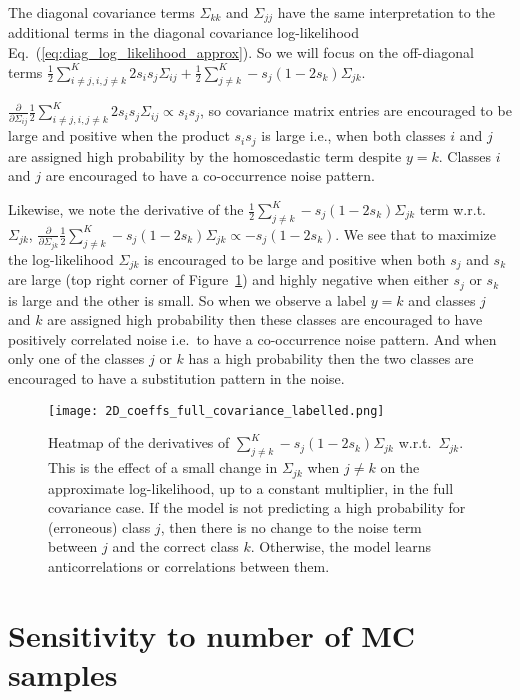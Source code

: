 \documentclass[final]{cvpr}
\begin{document}
The diagonal covariance terms $\Sigma_{kk}$ and $\Sigma_{jj}$ have the same interpretation to the additional terms in the diagonal covariance log-likelihood Eq.~(\ref{eq:diag_log_likelihood_approx}). So we will focus on the off-diagonal terms $\frac{1}{2} \sum_{i \neq j, i,j \neq k}^K 2 s_i s_j \Sigma_{ij} + \frac{1}{2} \sum_{j \neq k}^K - s_j (1 - 2 s_k) \Sigma_{jk}$.

$\frac{\partial}{\partial \Sigma_{ij}}\frac{1}{2} \sum_{i \neq j, i,j \neq k}^K 2 s_i s_j \Sigma_{ij} \propto s_i s_j$, so covariance matrix entries are encouraged to be large and positive when the product $s_i s_j$ is large i.e., when both classes $i$ and $j$ are assigned high probability by the homoscedastic term despite $y = k$. Classes $i$ and $j$ are encouraged to have a co-occurrence noise pattern.

Likewise, we note the derivative of the $\frac{1}{2} \sum_{j \neq k}^K - s_j (1 - 2 s_k) \Sigma_{jk}$ term w.r.t.\ $\Sigma_{jk}$, $\frac{\partial}{\partial \Sigma_{jk}} \frac{1}{2} \sum_{j \neq k}^K - s_j (1 - 2 s_k) \Sigma_{jk} \propto - s_j (1 - 2 s_k)$. We see that to maximize the log-likelihood $\Sigma_{jk}$ is encouraged to be large and positive when both $s_j$ and $s_k$ are large (top right corner of Figure~\ref{fig:2d_coeffs_full_covariance}) and highly negative when either $s_j$ or $s_k$ is large and the other is small. So when we observe a label $y = k$ and classes $j$ and $k$ are assigned high probability then these classes are encouraged to have positively correlated noise i.e.\ to have a co-occurrence noise pattern. And when only one of the classes $j$ or $k$ has a high probability then the two classes are encouraged to have a substitution pattern in the noise. 

\begin{figure}[t]
    \centering
    \texttt{[image: 2D\_coeffs\_full\_covariance\_labelled.png]}
    \caption{Heatmap of the derivatives of $\sum_{j \neq k}^K - s_j (1 - 2 s_k) \Sigma_{jk}$ w.r.t.\ $\Sigma_{jk}$. This is the effect of a small change in $\Sigma_{jk}$ when $j \neq k$ on the approximate log-likelihood, up to a constant multiplier, in the full covariance case. If the model is not predicting a high probability for (erroneous) class $j$, then there is no change to the noise term between $j$ and the correct class $k$. Otherwise, the model learns anticorrelations or correlations between them.}
    \label{fig:2d_coeffs_full_covariance}
\end{figure}

\section{Sensitivity to number of MC samples}
\label{app:mc_samples_sensitivity}
\end{document}
